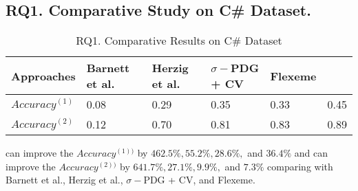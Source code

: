 \subsection{{\bf RQ1. Comparative Study on C\# Dataset.}}

\begin{table}[t]
	\caption{RQ1. Comparative Results on C\# Dataset}
	\vspace{-0.1in}
	\begin{center}
		\footnotesize
		\tabcolsep 4pt
		\renewcommand{\arraystretch}{1} \begin{tabular}{p{1.4cm}<{\centering}|p{1.3cm}<{\centering}p{1.2cm}<{\centering}p{1.4cm}<{\centering}p{0.8cm}<{\centering}|p{0.7cm}<{\centering}}
			
			\hline
			Approaches          & Barnett et al. & Herzig et al. & $\sigma-$PDG + CV& Flexeme & \tool\\
			\hline
			$Accuracy^{(1)}$   &        0.08    &		0.29	&		0.35      & 0.33	& 0.45     \\
			$Accuracy^{(2)}$   &        0.12    &		0.70	&		0.81	  & 0.83    & 0.89      \\
			\hline
		\end{tabular}
		\label{RQ1-result}
	\end{center}
\end{table}

\tool can improve the $Accuracy^{(1))}$ by $462.5\%, 55.2\%, 28.6\%, $ and $36.4\%$ and can improve the  $Accuracy^{(2))}$ by $641.7\%, 27.1\%, 9.9\%, $ and $7.3\%$ comparing with Barnett et al., Herzig et al., $\sigma-$PDG + CV, and Flexeme.